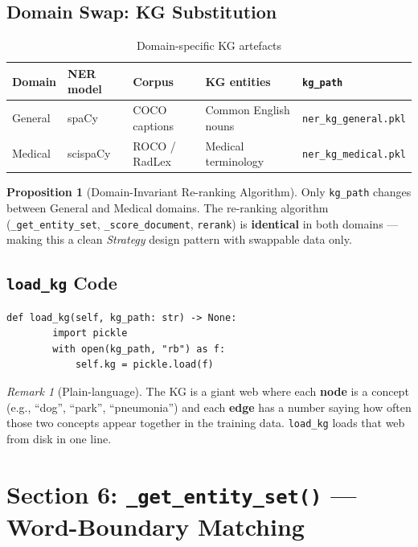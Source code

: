 \documentclass[12pt,a4paper]{article}
\theoremstyle{definition}
\newtheorem{proposition}[theorem]{Proposition}
\theoremstyle{remark}
\newtheorem{remark}[theorem]{Remark}
\begin{document}
\subsection{Domain Swap: KG Substitution}

\begin{table}[H]
\centering
\caption{Domain-specific KG artefacts}
\begin{tabular}{lllll}
\toprule
Domain & NER model & Corpus & KG entities & \texttt{kg\_path} \\
\midrule
General & spaCy & COCO captions & Common English nouns & \texttt{ner\_kg\_general.pkl} \\
Medical & scispaCy & ROCO / RadLex & Medical terminology & \texttt{ner\_kg\_medical.pkl} \\
\bottomrule
\end{tabular}
\end{table}

\begin{proposition}[Domain-Invariant Re-ranking Algorithm]
Only \texttt{kg\_path} changes between General and Medical domains.
The re-ranking algorithm (\texttt{\_get\_entity\_set}, \texttt{\_score\_document},
\texttt{rerank}) is \textbf{identical} in both domains --- making this a
clean \emph{Strategy} design pattern with swappable data only.
\end{proposition}

\subsection{\texttt{load\_kg} Code}

\begin{lstlisting}[caption={\texttt{NERKGReranker.load\_kg()}}]
    def load_kg(self, kg_path: str) -> None:
        import pickle
        with open(kg_path, "rb") as f:
            self.kg = pickle.load(f)
\end{lstlisting}

\begin{remark}[Plain-language]
The KG is a giant web where each \textbf{node} is a concept
(e.g., ``dog'', ``park'', ``pneumonia'') and each \textbf{edge} has a
number saying how often those two concepts appear together in the training
data. \texttt{load\_kg} loads that web from disk in one line.
\end{remark}

\section{Section 6: \texttt{\_get\_entity\_set()} --- Word-Boundary Matching}
\end{document}
